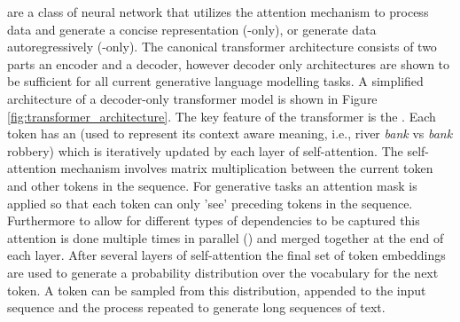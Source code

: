  \cite{vaswaniAttentionAllYou2017} are a class of neural network  that utilizes the attention mechanism to process data and generate a concise representation (-only), or generate data autoregressively (-only). The canonical transformer architecture consists of two parts an encoder and a decoder, however decoder only architectures are shown to be sufficient for all current generative language modelling tasks. A simplified architecture of a decoder-only transformer model is shown in Figure \ref{fig:transformer_architecture}. The key feature of the transformer is the . Each token has an  (used to represent its context aware meaning, i.e., river \textit{bank} vs \textit{bank} robbery) which is iteratively updated by each layer of self-attention. The self-attention mechanism involves matrix multiplication between the current token and other tokens in the sequence. For generative tasks an attention mask is applied so that each token can only 'see' preceding tokens in the sequence. Furthermore to allow for different types of dependencies to be captured this attention is done multiple times in parallel () and merged together at the end of each layer. After several layers of self-attention the final set of token embeddings are used to generate a probability distribution over the vocabulary for the next token. A token can be sampled from this distribution, appended to the input sequence and the process repeated to generate long sequences of text.

